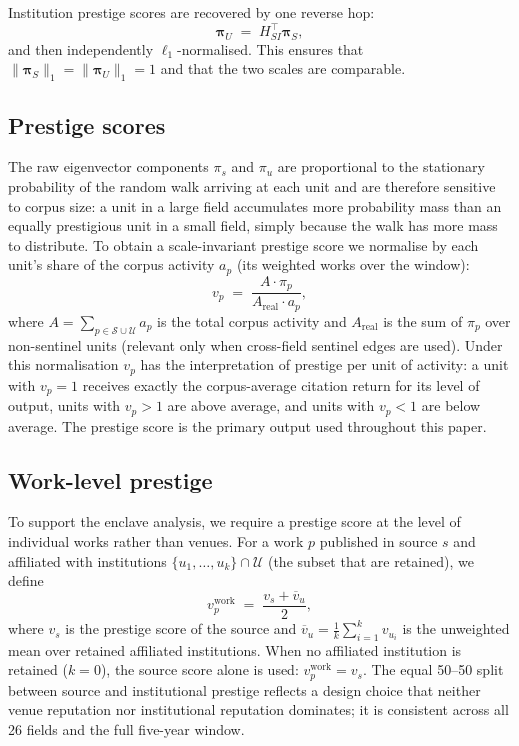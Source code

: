 Institution prestige scores are recovered by one reverse hop:
\[
  \boldsymbol{\pi}_U \;=\; H_{SI}^\top \boldsymbol{\pi}_S,
\]
and then independently $\ell_1$-normalised.  This ensures that
$\|\boldsymbol{\pi}_S\|_1 = \|\boldsymbol{\pi}_U\|_1 = 1$ and that the two
scales are comparable.

\subsection{Prestige scores}

The raw eigenvector components $\pi_s$ and $\pi_u$ are proportional to the
stationary probability of the random walk arriving at each unit and are
therefore sensitive to corpus size: a unit in a large field accumulates more
probability mass than an equally prestigious unit in a small field, simply
because the walk has more mass to distribute.  To obtain a scale-invariant
prestige score we normalise by each unit's share of the corpus activity $a_p$
(its weighted works over the window):
\[
  v_p \;=\; \frac{A \cdot \pi_p}{A_{\mathrm{real}} \cdot a_p},
\]
where $A = \sum_{p \in \mathcal{S} \cup \mathcal{U}} a_p$ is the total
corpus activity and $A_{\mathrm{real}}$ is the sum of $\pi_p$ over
non-sentinel units (relevant only when cross-field sentinel edges are used).
Under this normalisation $v_p$ has the interpretation of prestige per unit of
activity: a unit with $v_p = 1$ receives exactly the corpus-average citation
return for its level of output, units with $v_p > 1$ are above average, and
units with $v_p < 1$ are below average.  The prestige score is the primary
output used throughout this paper.

\subsection{Work-level prestige}

To support the enclave analysis, we require a prestige score at the level of
individual works rather than venues.  For a work $p$ published in source $s$
and affiliated with institutions $\{u_1, \ldots, u_k\} \cap \mathcal{U}$ (the
subset that are retained), we define
\[
  v_p^{\mathrm{work}} \;=\;
  \frac{v_s + \overline{v}_u}{2},
\]
where $v_s$ is the prestige score of the source and $\overline{v}_u =
\frac{1}{k}\sum_{i=1}^{k} v_{u_i}$ is the unweighted mean over retained
affiliated institutions.  When no affiliated institution is retained
($k = 0$), the source score alone is used: $v_p^{\mathrm{work}} = v_s$.  The
equal 50--50 split between source and institutional prestige reflects a design
choice that neither venue reputation nor institutional reputation dominates; it
is consistent across all 26 fields and the full five-year window.

